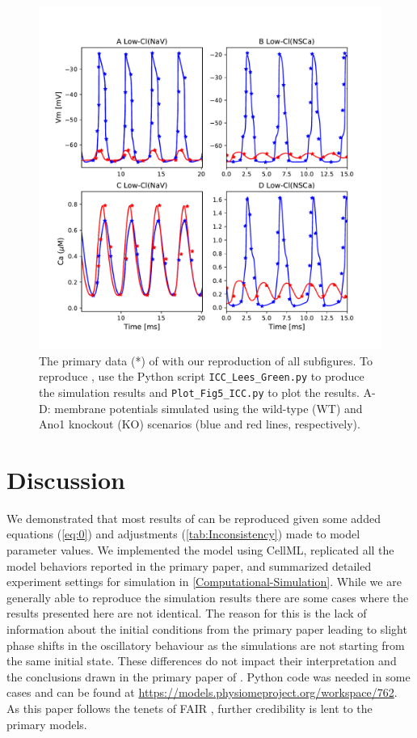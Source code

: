 \documentclass[fleqn,10pt]{physiome}
\begin{document}
\begin{figure}[ht!]%
\includegraphics[width=1\linewidth]{Figure5.pdf}
\caption{The primary data (*) of  \cite[Figure 5]{lees2014computational} with our reproduction of all subfigures. To reproduce \cite[Figure 5]{lees2014computational}, use the Python script \texttt{ICC\_Lees\_Green.py} to produce the simulation results and \texttt{Plot\_Fig5\_ICC.py} to plot the results. A-D: membrane potentials simulated using the wild-type (WT) and Ano1 knockout (KO) scenarios (blue and red lines, respectively).}
\label{fig:fig5}
\end{figure}



\section{Discussion}
We demonstrated that most results of \citet{lees2014computational} can be reproduced given some added equations (\autoref{eq:0}) and adjustments (\autoref{tab:Inconsistency}) made to model parameter values. We implemented the model \citep{lees2014computational} using CellML, replicated all the model behaviors reported in the primary paper, and summarized detailed
experiment settings for simulation in \autoref{Computational-Simulation}. While we are generally able to reproduce the simulation results there are some cases where the results presented here are not identical. The reason for this is the lack of information about the initial conditions from the primary paper leading to slight phase shifts in the oscillatory behaviour as the simulations are not starting from the same initial state. These differences do not impact their interpretation and the conclusions drawn in the primary paper of \citet{lees2014computational}.
Python code was needed in some cases and can be found at \url{https://models.physiomeproject.org/workspace/762}. 
As this paper follows the tenets of FAIR \citep{wilkinson2016fair}, further credibility is lent to the primary models.
\end{document}
